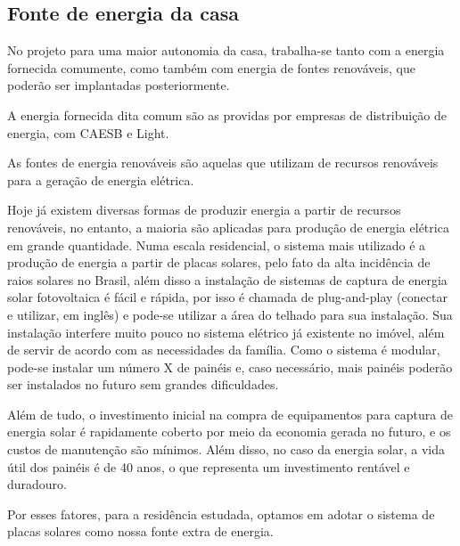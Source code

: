 \subsection{Fonte de energia da casa}
\par No projeto para uma maior autonomia da casa, trabalha-se tanto com a energia fornecida comumente, como também com energia de fontes renováveis, que poderão ser implantadas posteriormente.
\par A energia fornecida dita comum são as providas por empresas de distribuição de energia, com CAESB e Light.
\par As fontes de energia renováveis são aquelas que utilizam de recursos renováveis para a geração de energia elétrica.
\par Hoje já existem diversas formas de produzir energia a partir de recursos renováveis, no entanto, a maioria são aplicadas para produção de energia elétrica em grande quantidade. Numa escala residencial, o sistema mais utilizado é a produção de energia a partir de placas solares, pelo fato da alta incidência de raios solares no Brasil, além disso a instalação de sistemas de captura de energia solar fotovoltaica é fácil e rápida, por isso é chamada de plug-and-play (conectar e utilizar, em inglês) e pode-se utilizar a área do telhado para sua instalação. Sua instalação interfere muito pouco no sistema elétrico já existente no imóvel, além de servir de acordo com as necessidades da família. Como o sistema é modular, pode-se instalar um número X de painéis e, caso necessário, mais painéis poderão ser instalados no futuro sem grandes dificuldades.
\par Além de tudo, o investimento inicial na compra de equipamentos para captura de energia solar é rapidamente coberto por meio da economia gerada no futuro, e os custos de manutenção são mínimos. Além disso, no caso da energia solar, a vida útil dos painéis é de 40 anos, o que representa um investimento rentável e duradouro.
\par Por esses fatores, para a residência estudada, optamos em adotar o sistema de placas solares como nossa fonte extra de energia.

